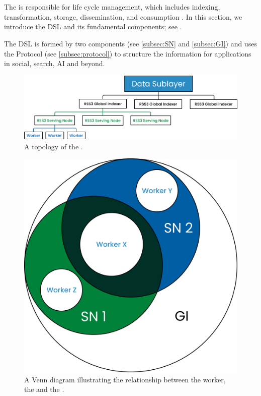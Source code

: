 \section{}
\label{sec:DSL}

The  is responsible for  life cycle management, which includes indexing, transformation, storage, dissemination, and consumption \cite{nationalinstituteofstandardsandtechnology2016Information}.
In this section, we introduce the \gls{DSL} and its fundamental components; see .

The \gls{DSL} is formed by two components (see \cref{subsec:SN} and \cref{subsec:GI}) and uses the \gls{Protocol} (see \cref{subsec:protocol}) to structure the information for applications in social, search, AI and beyond.

    {
        \begin{figure}[tb!]
            \centering
            \includegraphics[width=\columnwidth]{figures/DSL.png}
            \caption{A topology of the .}
            \label{fig:DSL}
        \end{figure}
    }


    {
        \begin{figure}[tb!]
            \centering
            \includegraphics[width=0.7\columnwidth]{figures/GI.png}
            \caption{A Venn diagram illustrating the relationship between the worker, the  and the .}
            \label{fig:GI}
        \end{figure}
    }



